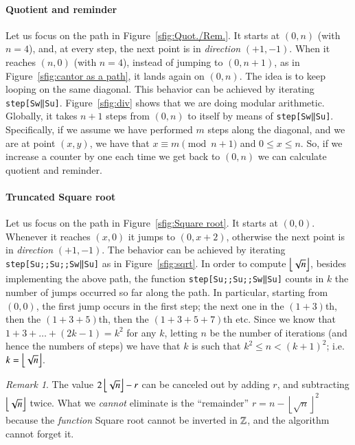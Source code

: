 \documentclass[preprint]{elsarticle}
\theoremstyle{remark}
\newtheorem{remark}{Remark}
\begin{document}
\paragraph{Quotient and reminder}
Let us focus on the path in Figure~\ref{sfig:Quot./Rem.}.
It starts at $(0,n)$ (with $ n = 4 $), and, at every step, the next point is in \emph{direction} $(+1,-1)$. When it reaches $(n,0)$ (with $ n = 4 $), instead of jumping to $(0,n+1)$, as in Figure~\ref{sfig:cantor as a path}, it lands again on $(0,n)$. The idea is to keep looping on the same diagonal. This behavior can be achieved by iterating \lstinline|step[Sw‖Su]|. Figure~\ref{sfig:div} shows that we are doing modular arithmetic.
Globally, it takes $n+1$ steps from $ (0,n) $ to itself by means of \lstinline|step[Sw‖Su]|.
Specifically, if we assume we have performed $m$ steps along the diagonal, and we are at point $ (x,y) $, we have that $x \equiv m \pmod{n+1}$ and $0 \le x \le n$.
So, if we increase a counter by one each time we get back to $(0,n)$ we can calculate quotient and reminder.

\paragraph{Truncated Square root}
Let us focus on the path in Figure~\ref{sfig:Square root}.
It starts at $(0,0)$. Whenever it reaches $(x,0)$ it jumps to $(0,x+2)$, otherwise the next point is in \emph{direction} $(+1,-1)$.
The behavior can be achieved by iterating \lstinline|step[Su;;Su;;Sw‖Su]| as in Figure~\ref{sfig:sqrt}.
In order to compute $ \left\lfloor \sqrt{n} \right\rfloor $, besides implementing the above path, the function \lstinline|step[Su;;Su;;Sw‖Su]| counts in $ k $ the number of jumps occurred so far along the path. In particular, starting from $ (0,0) $, the first jump occurs in the first step; the next one in the $(1+3)$th, then the $(1+3+5)$th, then the $(1+3+5+7)$th etc. Since we know that $1 + 3 + \dots + (2k - 1) = k^2$ for any $k$, letting $n$ be the number of iterations (and hence the numbers of steps) we have that $k$ is such that $k^2 \le n < (k+1)^2$; i.e. $k = \left\lfloor \sqrt{n} \right\rfloor$.

\begin{remark}
The value $2 \left\lfloor \sqrt{n} \right\rfloor - r$ can be canceled out by adding $r$, and subtracting $\left\lfloor \sqrt{n} \right\rfloor$ twice.
What we \emph{cannot} eliminate is the ``remainder'' $r = n - \left\lfloor \sqrt{n} \right\rfloor^2$ because the \emph{function} Square root
cannot be inverted in $ \mathbb{Z} $, and the algorithm cannot forget it.
\end{remark}
\end{document}

